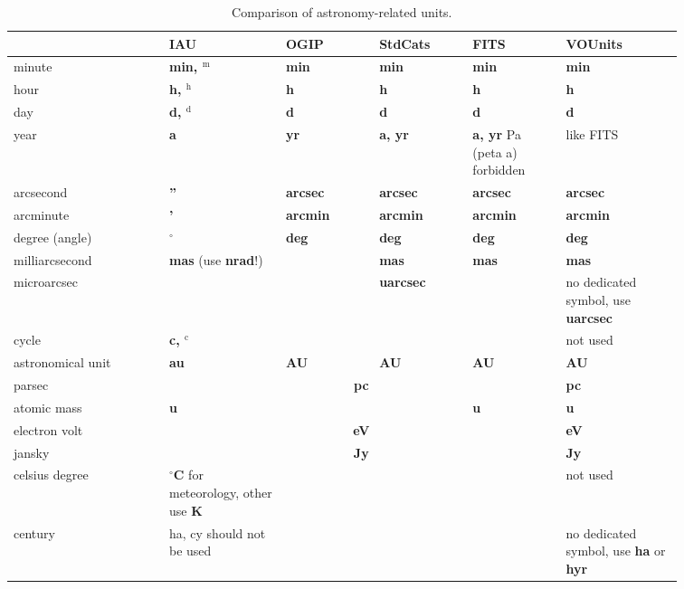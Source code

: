 \documentclass[11pt,notitlepage,onecolumn]{ivoa}
\newcommand{\unit}[1]{\textbf{\textsf{\color{orange}#1}}}
\begin{document}
\begin{table}[htb]
\begin{tabular}{|p{0.2\linewidth}|p{0.15\linewidth}|p{0.12\linewidth}|p{0.12\linewidth}|p{0.12\linewidth}|p{0.15\linewidth}|}
\hline
    & IAU & OGIP  & StdCats & FITS  & VOUnits\\\hline
    minute & \unit{min, $^\mathrm{m}$} & \unit{min} & \unit{min} & \unit{min} & \unit{min}\\\hline
    hour & \unit{h, $^\mathrm{h}$} & \unit{h} & \unit{h} & \unit{h} & \unit{h}\\\hline
    day & \unit{d, $^\mathrm{d}$} & \unit{d} & \unit{d} & \unit{d} & \unit{d}\\\hline
    year & \unit{a} & \unit{yr} & \unit{a, yr} & \unit{a, yr} Pa (peta a) forbidden& like FITS\\\hline
    arcsecond & \unit{''} & \unit{arcsec} & \unit{arcsec} & \unit{arcsec} & \unit{arcsec}\\\hline
    arcminute & \unit{'} & \unit{arcmin} & \unit{arcmin} & \unit{arcmin} & \unit{arcmin}\\\hline
    degree (angle) & \unit{$^\circ$} & \unit{deg} & \unit{deg} & \unit{deg} & \unit{deg}\\\hline
    milliarcsecond & \unit{mas} (use \unit{nrad}!)\raggedright &  & \unit{mas} & \unit{mas} & \unit{mas}\\\hline
    microarcsec &  &  & \unit{uarcsec} &  & no dedicated symbol, use
    \unit{uarcsec}\\\hline
    cycle & \unit{c, $^\mathrm{c}$} &  &  &  & not used\\\hline
    astronomical unit & \unit{au} & \unit{AU} & \unit{AU} & \unit{AU} & \unit{AU}\\\hline
    parsec & \multicolumn{4}{c|}{\unit{pc}} & \unit{pc}\\\hline
    atomic mass & \unit{u} &  &  & \unit{u} & \unit{u}\\\hline
    electron volt & \multicolumn{4}{c|}{\unit{eV}} & \unit{eV}\\\hline
    jansky & \multicolumn{4}{c|}{\unit{Jy}} & \unit{Jy}\\\hline
    celsius degree & \unit{$^\circ$C} for meteorology, other use \unit{K}\raggedright&  &  &  & not used\\\hline
    century & ha, cy should not be used &  &  &  & no dedicated symbol, use \unit{ha} or \unit{hyr}\\\hline
\end{tabular}
  \caption{Comparison of astronomy-related units.}
  \label{tabx:comparUnitAstro}
\end{table}
\end{document}
